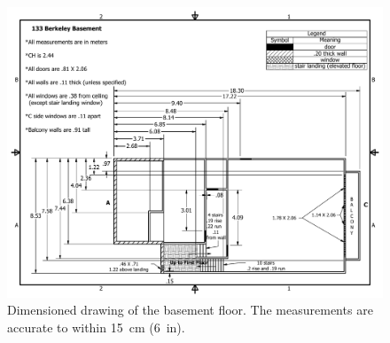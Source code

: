 \documentclass[12pt,oneside]{book}
\begin{document}
\begin{figure}[!ht]
\includegraphics[width=6.5in]{../Figures/Drawing_Basement_Metric}
\caption[Dimensioned drawing of the basement floor.]
{Dimensioned drawing of the basement floor. The measurements are accurate to within 15~cm (6~in).}
\label{fig:drawing_basement}
\end{figure}
\end{document}
